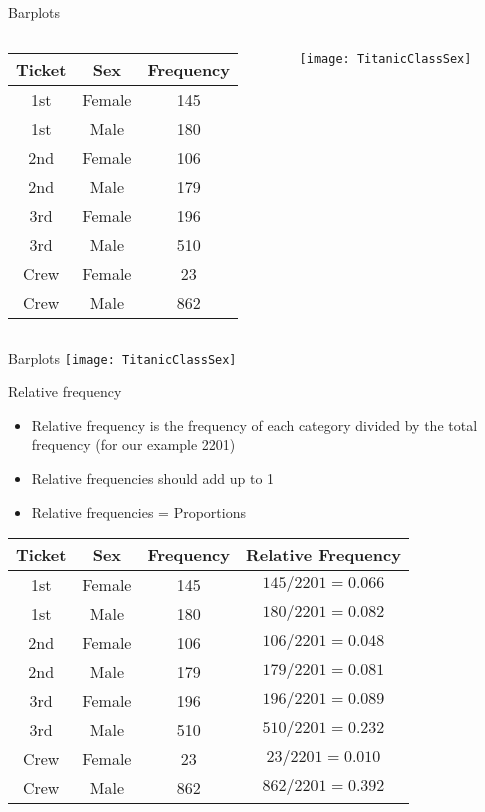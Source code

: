 \documentclass[xcolor=dvipsnames]{beamer}
\begin{document}
\begin{frame}{Barplots}
\begin{columns}
	\begin{column}{0.43 \textwidth}
		\begin{tabular}{|c|c|c|}
			\hline
			\textbf{Ticket} & \textbf{Sex} & \textbf{Frequency} \\
			\hline \hline
			1st & Female & 145\\
			\hline
			1st &  Male & 180\\
			\hline
			2nd & Female & 106\\
			\hline
			2nd  & Male & 179\\
			\hline
			3rd & Female & 196\\
			\hline
			3rd  & Male & 510\\
			\hline
			Crew & Female &  23\\
			\hline
			Crew  & Male & 862\\
			\hline
		\end{tabular}
	\end{column}
	\begin{column}{0.57 \textwidth}
		\texttt{[image: TitanicClassSex]}
	\end{column}
\end{columns}
\end{frame}

\begin{frame}{Barplots}
\texttt{[image: TitanicClassSex]}
\end{frame}

\begin{frame}{Relative frequency}
	\begin{itemize}
		\item Relative frequency is the frequency of each category divided by the total frequency (for our example 2201)
		\item Relative frequencies should add up to 1
		\item Relative frequencies = Proportions
	\end{itemize}
	\begin{center}
			\begin{tabular}{|c|c|c|c|}
			\hline
			\textbf{Ticket} & \textbf{Sex} & \textbf{Frequency} & \textbf{Relative Frequency}\\
			\hline \hline
			1st & Female & 145 & $145 / 2201 = 0.066$\\
			\hline
			1st &  Male & 180 & $180 / 2201 = 0.082$\\
			\hline
			2nd & Female & 106 & $106 / 2201 = 0.048$\\
			\hline
			2nd  & Male & 179 & $179 / 2201 = 0.081$\\
			\hline
			3rd & Female & 196 & $196 / 2201 = 0.089$\\
			\hline
			3rd  & Male & 510 & $510 / 2201 = 0.232$\\
			\hline
			Crew & Female &  23 & $23 / 2201 = 0.010$\\
			\hline
			Crew  & Male & 862 & $862 / 2201 = 0.392$\\
			\hline
		\end{tabular}
	\end{center}
\end{frame}
\end{document}
